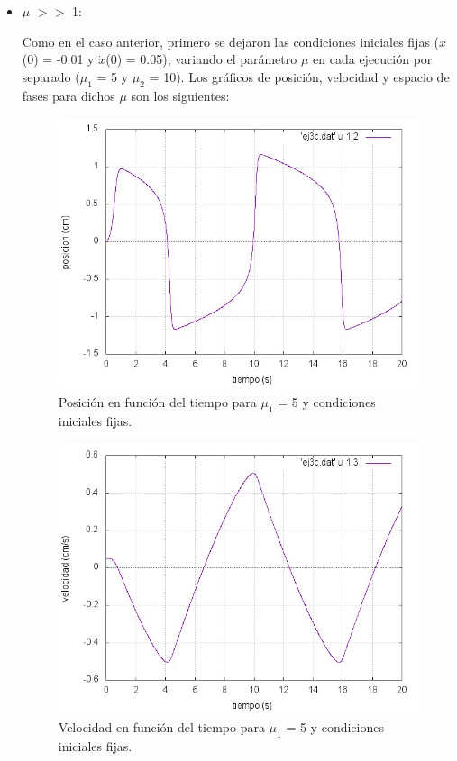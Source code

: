 \documentclass[a4paper,12pt]{article}
\begin{document}
\begin{itemize}
\item $\mu$ $>>$ 1:


Como en el caso anterior, primero se dejaron las condiciones iniciales fijas ($x$(0) = -0.01 y $\dot{x}$(0) = 0.05), variando el par\'ametro $\mu$ en cada ejecuci\'on por separado ($\mu_1$ = 5 y $\mu_2$ = 10). Los gr\'aficos de posici\'on, velocidad y espacio de fases para dichos $\mu$ son los siguientes:

\begin{figure}[H]
\begin{center}
\includegraphics[height=8cm]{grafico_ej3c_xVSt.jpg}
\caption[width=5cm]{Posici\'on en funci\'on del tiempo para $\mu_1$ = 5 y condiciones iniciales fijas.}
\end{center}
\end{figure}

\begin{figure}[H]
\begin{center}
\includegraphics[height=8cm]{grafico_ej3c_vVSt.jpg}
\caption[width=5cm]{Velocidad en funci\'on del tiempo para $\mu_1$ = 5 y condiciones iniciales fijas.}
\end{center}
\end{figure}


\end{itemize}
\end{document}

